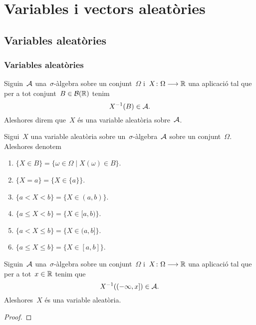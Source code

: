 \documentclass[../Apunts.tex]{subfiles}
\begin{document}
\chapter{Variables i vectors aleatòries}
\section{Variables aleatòries}
\subsection{Variables aleatòries}
	\begin{definition}
		\label{def:variable aleatòria}
		Siguin~\(\mathcal{A}\) una~\(\sigma\)-àlgebra sobre un conjunt~\(\Omega\) i~\(X\colon\Omega\longrightarrow\mathbb{R}\) una aplicació tal que per a tot conjunt~\(B\in\mathcal{B}(\mathbb{R})\) tenim
		\[X^{-1}(B)\in\mathcal{A}.\]
		Aleshores direm que~\(X\) és una variable aleatòria sobre~\(\mathcal{A}\).
	\end{definition}
	\begin{example}
	\end{example}
	\begin{notation}
		\label{not:variables aleatòries}
		Sigui~\(X\) una variable aleatòria sobre un~\(\sigma\)-àlgebra~\(\mathcal{A}\) sobre un conjunt~\(\Omega\). Aleshores denotem
		\begin{enumerate}
			\item \(\{X\in B\}=\{\omega\in\Omega\mid X(\omega)\in B\}\).
			\item \(\{X=a\}=\{X\in\{a\}\}\).
			\item \(\{a< X<b\}=\{X\in(a,b)\}\).
			\item \(\{a\leq X<b\}=\{X\in[a,b)\}\).
			\item \(\{a< X\leq b\}=\{X\in(a,b]\}\).
			\item \(\{a\leq X\leq b\}=\{X\in[a,b]\}\).
		\end{enumerate}
	\end{notation}
	\begin{proposition}
		\label{prop:condició suficient per ser una variable aleatòria}
		Siguin~\(\mathcal{A}\) una~\(\sigma\)-àlgebra sobre un conjunt~\(\Omega\) i~\(X\colon\Omega\longrightarrow\mathbb{R}\) una aplicació tal que per a tot~\(x\in\mathbb{R}\) tenim que
		\[X^{-1}((-\infty,x])\in\mathcal{A}.\]
		Aleshores~\(X\) és una variable aleatòria.
		\begin{proof}
		\end{proof}
	\end{proposition}
\end{document}
